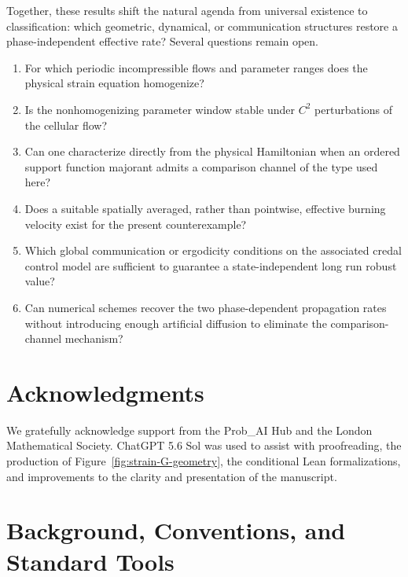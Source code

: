 \documentclass[11pt,reqno,noamsfonts]{amsart}
\theoremstyle{definition}
\theoremstyle{remark}
\begin{document}
Together, these results shift the natural agenda from universal
existence to classification: which geometric, dynamical, or
communication structures restore a phase-independent effective rate?
Several questions remain open.

\begin{enumerate}[label=\textbf{Q\arabic*.}]
\item For which periodic incompressible flows and parameter ranges does
the physical strain equation homogenize?

\item Is the nonhomogenizing parameter window stable under $C^2$
perturbations of the cellular flow?

\item Can one characterize directly from the physical Hamiltonian when
an ordered support function majorant admits a comparison channel of the
type used here?

\item Does a suitable spatially averaged, rather than pointwise,
effective burning velocity exist for the present counterexample?

\item Which global communication or ergodicity conditions on the
associated credal control model are sufficient to guarantee a
state-independent long run robust value?

\item Can numerical schemes recover the two phase-dependent propagation
rates without introducing enough artificial diffusion to eliminate the
comparison-channel mechanism?
\end{enumerate}


\section*{Acknowledgments}
We gratefully acknowledge support from the Prob\_AI Hub and the London Mathematical Society. 
ChatGPT 5.6 Sol was used to assist with proofreading, the production of
Figure~\ref{fig:strain-G-geometry}, the conditional Lean formalizations,
and improvements to the clarity and presentation of the manuscript.

\appendix


\section{Background, Conventions, and Standard Tools}\label{app:background}
\end{document}
